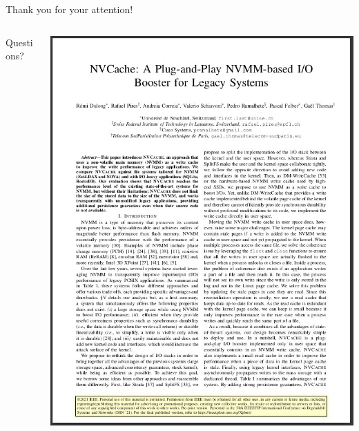 \documentclass[presentation]{beamer}
\begin{document}
\begin{frame}[label={sec:orgd714ab1}]{Thank you for your attention!}
\begin{columns}
\begin{column}{0.4\columnwidth}
\begin{block}{}
Questions?\\
\end{block}
\end{column}


\begin{column}{0.6\columnwidth}
\begin{block}{}
\begin{center}
\includegraphics[width=.9\linewidth]{./IMGs/paper.jpg}
\end{center}
\end{block}
\end{column}
\end{columns}
\end{frame}
\end{document}

